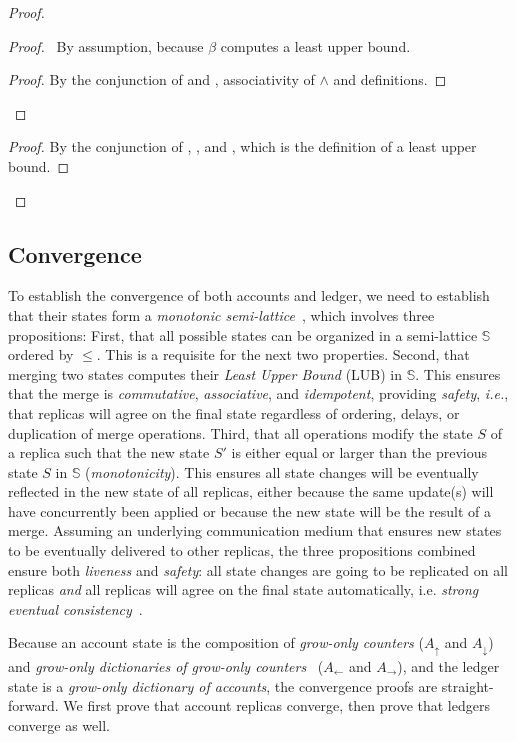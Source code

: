 \documentclass[9pt]{article}   	%
\begin{document}
\begin{proof}
\begin{proof}
{			\pf~By assumption, because $\beta$ computes a least upper bound.
		}
		
		\qedstep
		\begin{proof}
			By the conjunction of  and , associativity of $\wedge$ and definitions.
		\end{proof}
	\end{proof}
		
	\qedstep
	\begin{proof}
		By the conjunction of , , and , which is the definition of a least upper bound.
	\end{proof}
\end{proof}

\subsection{Convergence}

To establish the convergence of both accounts and ledger, we need to establish that their states form a \textit{monotonic semi-lattice}~\cite{shapiro:hal-00932836}, which involves three propositions: First, that all possible states can be organized in a semi-lattice $\mathds{S}$ ordered by $\leq$. This is a requisite for the next two properties. Second, that merging two states computes their \textit{Least Upper Bound} (LUB) in $\mathds{S}$. This ensures that the merge is \textit{commutative}, \textit{associative}, and \textit{idempotent}, providing \textit{safety}, \textit{i.e.}, that replicas will agree on the final state regardless of ordering, delays, or duplication of merge operations. Third, that all operations modify the state $S$ of a replica such that the new state $S'$ is either equal or larger than the previous state $S$ in $\mathds{S}$ (\textit{monotonicity}). This ensures all state changes will be eventually reflected in the new state of all replicas, either because the same update(s) will have concurrently been applied or because the new state will be the result of a merge. Assuming an underlying communication medium that ensures new states to be eventually delivered to other replicas, the three propositions combined ensure both \textit{liveness} and \textit{safety}: all state changes are going to be replicated on all replicas \textit{and} all replicas will agree on the final state automatically, i.e. \textit{strong eventual consistency}~\cite{shapiro:hal-00932836}.

Because an account state is the composition of \textit{grow-only counters} ($A_\uparrow$ and $A_\downarrow$) and \textit{grow-only dictionaries of grow-only counters}~\cite{lavoie2023statebased} ($A_\leftarrow$ and $A_\rightarrow$), and the ledger state is a \textit{grow-only dictionary of accounts}, the convergence proofs are straight-forward. We first prove that account replicas converge, then prove that ledgers converge as well.
\end{document}
